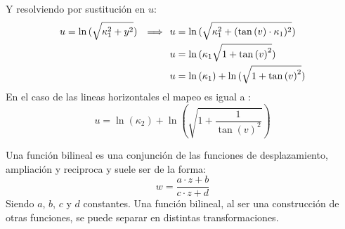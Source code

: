 Y resolviendo por sustitución en $u$:
\begin{equation}
    \begin{aligned}
         u=\ln{(\sqrt{\kappa_1^2+y^2})}\hspace{0.25cm} \Longrightarrow \hspace{0.25cm} &u=\ln{(\sqrt{\kappa_1^2+(\tan{(v)}\cdot\kappa_1)^2})}\\
                                            &u=\ln{(\kappa_1\sqrt{1+\tan{(v)}^2})}\\
                                            &u=\ln{(\kappa_1)}+\ln{(\sqrt{1+\tan{(v)}^2})}
    \end{aligned}
\end{equation}
En el caso de las lineas horizontales el mapeo es igual a :
\begin{equation}
    u=\ln{(\kappa_2)}+\ln{(\sqrt{1+\frac{1}{\tan{(v)}^2}})}
\end{equation}
\begin{figure}[H]
    \centering
    
    \caption*{}
    \label{fig:enter-label}
\end{figure}

Una función bilineal es una conjunción de las funciones de desplazamiento, ampliación y reciproca y suele ser de la forma:
\begin{equation}
    w=\frac{a\cdot z+b}{c\cdot z+d}
    \label{eq:DefBil}
\end{equation}
Siendo $a$, $b$, $c$ y $d$ constantes.
Una función bilineal, al ser una construcción de otras funciones, se puede separar en distintas transformaciones.

